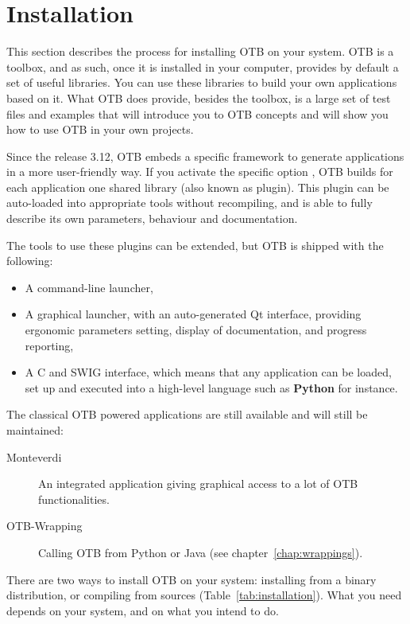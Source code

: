 \chapter{Installation}
\label{chapter:Installation}

This section describes the process for installing OTB on your system.
OTB is a toolbox, and as such, once it is installed in your computer, provides by default a set of useful libraries. You can use
these libraries to build your own applications based on it. What OTB does provide, besides the toolbox, is a
large set of test files and examples that will introduce you to OTB concepts
and will show you how to use OTB in your own projects.

Since the release 3.12, OTB embeds a specific framework to generate applications
in a more user-friendly way. If you
activate the specific option , OTB builds for each
application one shared library (also known as plugin). This plugin can be
auto-loaded into appropriate tools without recompiling, and is able to
fully describe its own parameters, behaviour and documentation.

The tools to use these plugins can be extended, but OTB is shipped with the
following:
\begin{itemize}
\item A command-line launcher,
\item A graphical launcher, with an auto-generated Qt interface,
  providing ergonomic parameters setting, display of documentation,
  and progress reporting,
\item A C and SWIG interface, which means that any application can be
  loaded, set up and executed into a high-level language such as \textbf{Python}
  for instance.
\end{itemize}



The classical OTB powered applications are still available and will still be maintained:
\begin{description}
\item [Monteverdi]{An integrated application giving graphical access to a lot of OTB
functionalities.}
\item[OTB-Wrapping]{Calling OTB from Python or Java (see chapter~\ref{chap:wrappings}).}
\end{description}

There are two ways to install OTB on your system: installing from a binary distribution,
or compiling from sources (Table~\ref{tab:installation}). What you need depends on your system, and on what you intend to do.

